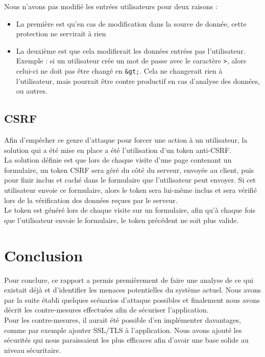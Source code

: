 \documentclass[a4paper,10pt]{article}
\begin{document}
Nous n'avons pas modifié les entrées utilisateurs pour deux raisons : 
 \begin{onehalfspacing}
        \begin{itemize}
        \item La première est qu'en cas de modification dans la source de donnée, cette protection ne servirait à rien
        \item La deuxième est que cela modifierait les données entrées pas l'utilisateur. Exemple : si un utilisateur crée un mot de passe avec le caractère \verb|>|, alors celui-ci ne doit pas être changé en \verb|&gt;|. Cela ne changerait rien à l'utilisateur, mais pourrait être contre productif en cas d'analyse des données, ou autres. \\
        \end{itemize}
        \end{onehalfspacing}
    \subsection*{CSRF}
    Afin d'empêcher ce genre d'attaque pour forcer une action à un utilisateur, la solution qui a été mise en place a été l'utilisation d'un token anti-CSRF. \\

La solution définie est que lors de chaque visite d'une page contenant un formulaire, un token CSRF sera géré du côté du serveur, envoyée au client, puis pour finir inclus et caché dans le formulaire que l'utilisateur peut envoyer. Si cet utilisateur envoie ce formulaire, alors le token sera lui-même inclus et sera vérifié lors de la vérification des données reçues par le serveur. \\

Le token est généré lors de chaque visite sur un formulaire, afin qu'à chaque fois que l'utilisateur envoie le formulaire, le token précédent ne soit plus valide.
\section*{Conclusion}
Pour conclure, ce rapport a permis premièrement de faire une analyse de ce qui existait déjà et d'identifier les menaces potentielles du système actuel. Nous avons par la suite établi quelques scénarios d'attaque possibles et finalement nous avons décrit les contre-mesures effectuées afin de sécuriser l'application. \\

Pour les contre-mesures, il aurait été possible d'en implémenter davantages, comme par exemple ajouter SSL/TLS à l'application. Nous avons ajouté les sécurités qui nous paraissaient les plus efficaces afin d'avoir une base solide au niveau sécuritaire.
\end{document}
